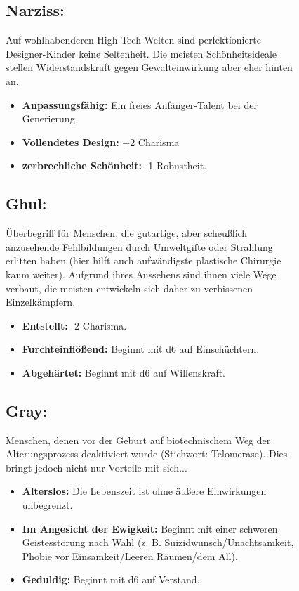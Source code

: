 \documentclass[10pt,a4paper]{report}
\begin{document}
\begin{figure}[h!]
\subsection*{Narziss:} Auf wohlhabenderen High-Tech-Welten sind perfektionierte Designer-Kinder keine Seltenheit. Die meisten Schönheitsideale stellen Widerstandskraft gegen Gewalteinwirkung aber eher hinten an.
\begin{itemize}
\item \textbf{Anpassungsfähig:} Ein freies Anfänger-Talent bei der Generierung
\item \textbf{Vollendetes Design:} +2 Charisma
\item \textbf{zerbrechliche Schönheit:} -1 Robustheit.
\end{itemize}
\end{figure}

\begin{figure}[h!]
\subsection*{Ghul:} Überbegriff für Menschen, die gutartige, aber scheußlich anzusehende Fehlbildungen durch Umweltgifte oder Strahlung erlitten haben (hier hilft auch aufwändigste plastische Chirurgie kaum weiter). Aufgrund ihres Aussehens sind ihnen viele Wege verbaut, die meisten entwickeln sich daher zu verbissenen Einzelkämpfern.
\begin{itemize}
\item \textbf{Entstellt:} -2 Charisma.
\item \textbf{Furchteinflößend:} Beginnt mit d6 auf Einschüchtern.
\item \textbf{Abgehärtet:} Beginnt mit d6 auf Willenskraft.
\end{itemize}
\end{figure}

\begin{figure}[h!]
\subsection*{Gray:} Menschen, denen vor der Geburt auf biotechnischem Weg der Alterungsprozess deaktiviert wurde (Stichwort: Telomerase). Dies bringt jedoch nicht nur Vorteile mit sich...
\begin{itemize}
\item \textbf{Alterslos:} Die Lebenszeit ist ohne äußere Einwirkungen unbegrenzt.
\item \textbf{Im Angesicht der Ewigkeit:} Beginnt mit einer schweren Geistesstörung nach Wahl (z. B. Suizidwunsch/Unachtsamkeit, Phobie vor Einsamkeit/Leeren Räumen/dem All).
\item \textbf{Geduldig:} Beginnt mit d6 auf Verstand.
\end{itemize}
\end{figure}
\end{document}

